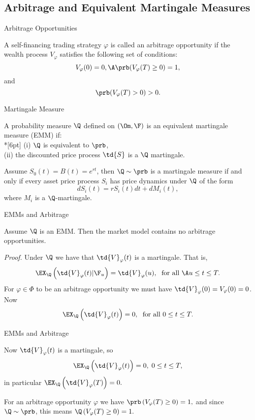 \subsection{Arbitrage and Equivalent Martingale Measures}

{ Arbitrage Opportunities}

A self-financing trading strategy $\varphi$ is called an arbitrage
opportunity if the wealth process $V_\varphi$ satisfies the
following set of conditions:
$$
V_\varphi(0)=0,\A \prb(V_\varphi(T) \geq 0) =1,
$$
and
$$
\prb(V_\varphi(T) > 0) >0.
$$


{ Martingale Measure}

A probability measure $\Q$ defined on $(\Om,\F)$ is an equivalent
martingale measure (EMM) if:\\*[6pt]
(i) $\Q$ is equivalent to $\prb$,\\
(ii) the discounted price process $\td{S}$ is a $\Q$ martingale.

Assume $S_0(t) = B(t) = e^{rt}$, then $\Q \sim \prb$ is a
martingale measure if and only if every asset price process $S_i$
has price dynamics under $\Q$ of the form
$$
dS_i(t) = r S_i(t) dt + dM_i(t),
$$
where $M_i$ is a $\Q$-martingale.

{ EMMs and Arbitrage}

Assume $\Q$ is an EMM. Then the market model contains no arbitrage
opportunities.

{\it Proof.} Under $\Q$ we have that $\td{V}_\varphi(t)$ is a
martingale. That is,
$$
\EX_{\Q}\left(\td{V}_\varphi(t)|\F_u\right) = \td{V}_\varphi(u),\;
\mbox{ for all }\A u \leq t \leq T.
$$
For $\varphi \in \Phi$ to be an arbitrage opportunity we must have
$\td{V}_\varphi(0) =V_\varphi(0)= 0$.  Now
$$
\EX_{\Q}\left(\td{V}_\varphi(t)\right) = 0,\; \mbox{ for all } 0
\leq t \leq T.
$$

{ EMMs and Arbitrage}

Now $\td{V}_\varphi(t)$ is a martingale, so
$$
\EX_{\Q}\left(\td{V}_\varphi(t)\right) = 0,\; 0 \leq t \leq T,
$$
in particular $ \EX_{\Q}\left(\td{V}_\varphi(T)\right) = 0. $

For an arbitrage opportunity $\varphi$ we have $
\prb\left(V_\varphi(T) \geq 0\right) =1, $ and since $\Q \sim
\prb$, this means $ \Q\left(V_\varphi(T) \geq 0\right) =1. $


